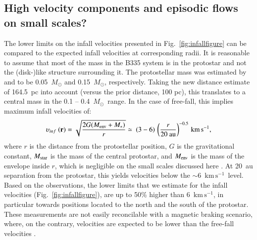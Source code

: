 \documentclass{aa}
\newcommand{\kmpers}{\ensuremath{\mathrm{km \, s^{-1}}}\xspace} %
\newcommand{\about}{$\sim$}                       %
\newcommand{\msun}{\ensuremath{M_{\odot}}\xspace}
\begin{document}
\subsection{High velocity components and episodic flows on small scales?}
\label{sub:smallscalecomponents}
The lower limits on the infall velocities presented in Fig.~\ref{fig:infallfigure} can be compared to the expected infall velocities at corresponding radii. 
It is reasonable to assume that most of the mass in the B335 system is in the protostar and not the (disk-)like structure surrounding it. The protostellar mass was estimated by \citet{Yen:2015vf} and \citet{Evans:2015qp} to be 0.05~\msun and 0.15~\msun, respectively. Taking the new distance estimate of 164.5~pc into account (versus the prior distance, 100 pc), this translates to a central mass in the 0.1 -- 0.4~\msun\ range. In the case of free-fall, this implies maximum infall velocities of:
\begin{equation}
    \upsilon_{inf}~\mathbf{(r)} = \sqrt{\frac{2G(M_{\rm{env}}+M_{*})}{r}} \simeq\ {(3-6)}\,\left(\frac{r}{20~ \rm{au}}\right)^{-0.5}\,\kmpers,
    \label{eq:maxinfall}
\end{equation}
where $r$ is the distance from the protostellar position, $G$ is the gravitational constant, $M_{\rm{star}}$ is the mass of the central protostar, and $M_{\rm{env}}$ is the mass of the envelope inside $r$, which is negligible on the small scales discussed here \citep[less than 0.1\% of the total envelope mass assuming the density profile of][Appendix C]{Kristensen:2012kx}. At 20~au separation from the protostar, this yields velocities below the \about6~\kmpers\ level. Based on the observations, the lower limits that we estimate for the infall velocities (Fig.~\ref{fig:infallfigure}), are up to 50\% higher than 6~\kmpers, in particular towards positions located to the north and the south of the protostar. These measurements are not easily reconcilable with a magnetic braking scenario, where, on the contrary, velocities are expected to be lower than the free-fall velocities \citep[see e.g.,][Figs. 4, 7 \& 12]{Lam:2019aa}. 
\end{document}
